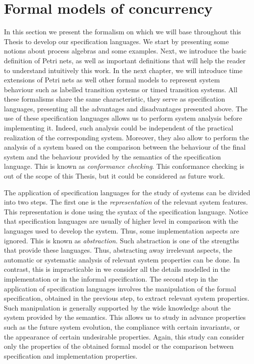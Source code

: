 \section{Formal models of concurrency}\label{formalmodels}
In this section we present the formalism on which we will base
throughout this Thesis to develop our specification languages. We start by presenting
some notions about process algebras and some examples. Next, we introduce the basic definition of
Petri nets, as well as important definitions that will help the reader to understand intuitively this work.
In the next chapter, we will introduce time extensions of Petri nets as well other formal models to represent
system behaviour such as labelled transition systems or timed transition systems.
All these formalisms share the same characteristic, they serve as 
specification languages, presenting all the advantages and disadvantages presented above. 
The use of these specification languages allows us to perform system analysis before implementing it. 
Indeed, such analysis could be independent of the practical realization 
of the corresponding system. Moreover, they also allow to 
perform the analysis of a system based on
the comparison between the behaviour of the final system 
and the behaviour provided by the semantics of the specification language. This is known as \emph{conformance checking}.
This conformance checking is out of the scope of this Thesis, but it could be considered as future work.

The application of specification languages for the study of systems
can be divided into two steps. The first one is the \emph{representation}
of the relevant system features. This representation is done using the syntax 
of the specification language. Notice that specification languages are usually of higher level
in comparison with the languages used to develop the system. Thus,
some implementation aspects are ignored. This is known as \emph{abstraction}.
Such abstraction is one of the strengths that provide these languages. Thus, abstracting away irrelevant aspects,
the automatic or systematic analysis of relevant system properties can be done. In contrast, this is 
impracticable in we consider all the details modelled in the implementation or in the informal specification.
The second step in the application of specification languages
involves the manipulation of the formal specification, obtained in the previous step, to
extract relevant system properties. Such manipulation
is generally supported by the wide knowledge about the system provided by the semantics. 
This allows us to study in advance properties such as the future system evolution, the
compliance with certain invariants, or the appearance of certain undesirable properties. 
Again, this study can consider only the properties of the obtained formal model or the comparison
between specification and implementation properties.

